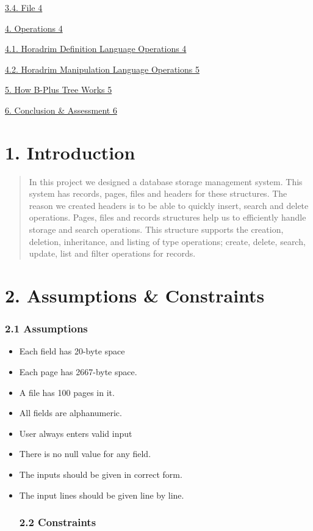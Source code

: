 \documentclass[
]{article}
\begin{document}
\protect\hyperlink{file}{3.4. File 4}

\protect\hyperlink{operations}{4. Operations 4}

\protect\hyperlink{horadrim-definition-language-operations}{4.1.
Horadrim Definition Language Operations 4}

\protect\hyperlink{horadrim-manipulation-language-operations}{4.2.
Horadrim Manipulation Language Operations 5}

\protect\hyperlink{how-b-plus-tree-works}{5. How B-Plus Tree Works 5}

\protect\hyperlink{conclusion-assessment}{6. Conclusion \& Assessment 6}

\hypertarget{introduction}{%
\section{\texorpdfstring{1. 
Introduction}{ Introduction}}\label{introduction}}

\begin{quote}
In this project we designed a database storage management system. This
system has records, pages, files and headers for these structures. The
reason we created headers is to be able to quickly insert, search and
delete operations. Pages, files and records structures help us to
efficiently handle storage and search operations. This structure
supports the creation, deletion, inheritance, and listing of type
operations; create, delete, search, update, list and filter operations
for records.
\end{quote}



  \hypertarget{assumptions-constraints}{%
  \section{2. Assumptions \& Constraints}\label{assumptions-constraints}}


    \hypertarget{assumptions}{%
    \subsubsection{2.1 Assumptions}\label{assumptions}}


\begin{itemize}
\item
  Each field has 20-byte space
\item
  Each page has 2667-byte space.
\item
  A file has 100 pages in it.
\item
  All fields are alphanumeric.
\item
  User always enters valid input
\item
  There is no null value for any field.
\item
  The inputs should be given in correct form.
\item
  The input lines should be given line by line.

    \hypertarget{constraints}{%
    \subsubsection{2.2 Constraints}\label{constraints}}
\end{itemize}
\end{document}
